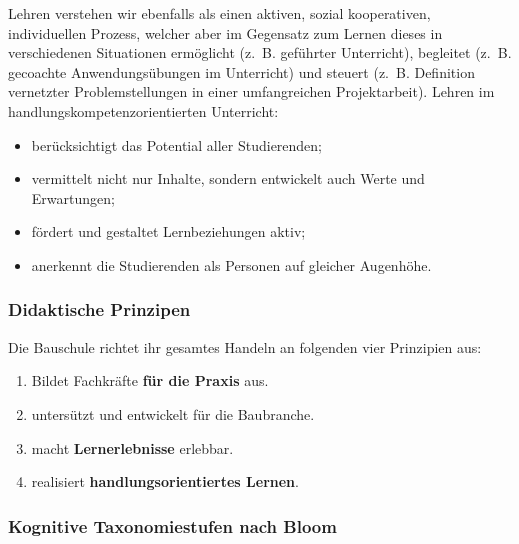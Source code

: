 \documentclass[
11pt,
captions=tableheading,
smallheadings,
headsepline,
footsepline, 
captions=tableheading,
parskip=half-,
]{scrartcl}
\begin{document}
Lehren verstehen wir ebenfalls als einen aktiven, sozial kooperativen, individuellen Prozess, welcher aber im Gegensatz zum Lernen dieses in verschiedenen Situationen ermöglicht (z.~B. geführter Unterricht), begleitet (z.~B. gecoachte Anwendungsübungen im Unterricht) und steuert (z.~B. Definition vernetzter Problemstellungen in einer umfangreichen Projektarbeit). Lehren im handlungskompetenzorientierten Unterricht:
\begin{itemize}
    \item berücksichtigt das Potential aller Studierenden;
    \item vermittelt nicht nur Inhalte, sondern entwickelt auch Werte und Erwartungen;
    \item fördert und gestaltet Lernbeziehungen aktiv;
    \item anerkennt die Studierenden als Personen auf gleicher Augenhöhe.
\end{itemize}

\subsubsection{Didaktische Prinzipen}
Die Bauschule richtet ihr gesamtes Handeln an folgenden vier Prinzipien aus:
\begin{enumerate}
    \item Bildet Fachkräfte \textbf{für die Praxis} aus.
    \item untersützt und entwickelt   für die Baubranche.
    \item macht \textbf{Lernerlebnisse} erlebbar.
    \item realisiert \textbf{handlungsorientiertes Lernen}.
\end{enumerate}


\subsubsection{Kognitive Taxonomiestufen nach Bloom}
\end{document}
